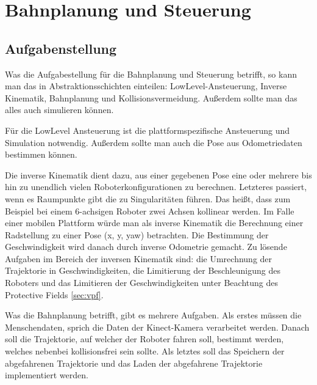 \chapter{Bahnplanung und Steuerung}
\label{bahnplanung_steuerung_cha}

\section{Aufgabenstellung}
\label{bahnplanung_aufgabenstellung_sec}
\authorsection{\editoroier}


Was die Aufgabestellung für die Bahnplanung und Steuerung betrifft, so kann man das in Abstraktionsschichten einteilen:
LowLevel-Ansteuerung, Inverse Kinematik, Bahnplanung und Kollisionsvermeidung.
Außerdem sollte man das alles auch simulieren können.

Für die LowLevel Ansteuerung ist die plattformspezifische Ansteuerung und Simulation notwendig. Außerdem sollte man auch die Pose aus Odometriedaten bestimmen können.

Die inverse Kinematik dient dazu, aus einer gegebenen Pose eine oder mehrere bis hin zu unendlich vielen Roboterkonfigurationen zu berechnen. Letzteres passiert, wenn es Raumpunkte gibt die zu Singularitäten führen. Das heißt, dass zum Beispiel bei einem 6-achsigen Roboter zwei Achsen kollinear werden. Im Falle einer mobilen Plattform würde man als inverse Kinematik die Berechnung einer Radstellung zu einer Pose (x, y, yaw) betrachten. Die Bestimmung der Geschwindigkeit wird danach durch inverse Odometrie gemacht. Zu lösende Aufgaben im Bereich der inversen Kinematik sind: die Umrechnung der Trajektorie in Geschwindigkeiten, die Limitierung der Beschleunigung des Roboters und das Limitieren der Geschwindigkeiten unter Beachtung des Protective Fields \ref{sec:vpf}.

Was die Bahnplanung betrifft, gibt es mehrere Aufgaben. Als erstes müssen die Menschendaten, sprich die Daten der Kinect-Kamera verarbeitet werden. Danach soll die Trajektorie, auf welcher der Roboter fahren soll, bestimmt werden, welches nebenbei kollisionsfrei sein sollte. Als letztes soll das Speichern der abgefahrenen Trajektorie und das Laden der abgefahrene Trajektorie implementiert werden.


